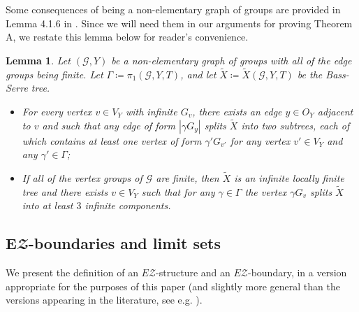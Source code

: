 \documentclass[12pt, a4paper]{article}
\newcommand{\8}{\infty}
\newcommand{\abs}[1]{\left| #1 \right|}
\theoremstyle{break}
\newtheorem{lm}[thm]{Lemma}
\theoremstyle{defbreak}
\newcommand{\wtl}[1]{\widetilde{#1}}
\begin{document}
Some consequences of being a non-elementary graph of groups are provided in Lemma 4.1.6 in \cite{dense-amalgam}. 
Since we will need them in our arguments
 for proving Theorem A, we restate this lemma below
 for reader's convenience.\medskip

\begin{lm}\label{lemma:behaviour_of_nonelementary_gog}
    Let $(\mathcal{G},Y)$ be a non-elementary graph of groups with all of the edge groups being finite. Let $\Gamma\coloneqq\pi_1(\mathcal G, Y, T)$, and let $\wtl{X} \coloneqq\wtl{X}(\mathcal{G}, Y, T)$ be the Bass-Serre tree.
    \begin{itemize}
        \item[(i)] For every vertex $v\in V_Y$ with infinite $G_v$, there exists an edge $y\in O_Y$ adjacent to $v$ and such that any edge of form $\abs{\gamma G_y}$ splits $\wtl{X}$ into two subtrees, each of which contains at least one vertex of form $\gamma' G_{v'}$ for any vertex $v'\in V_Y$ and any $\gamma'\in\Gamma$;
        \item[(ii)] If all of the vertex groups of $\mathcal{G}$ are finite, then 
        $\wtl{X}$ is an infinite locally finite tree and
        there exists $v\in V_Y$ such that for any $\gamma\in\Gamma$ the vertex
        $\gamma G_v$ splits $\wtl{X}$ into at least $3$ infinite components.
    \end{itemize}
\end{lm}




\subsection{\texorpdfstring{$\mathbf{E}\mathbfcal{Z}$}{EZ}-boundaries
and limit sets}\label{Subsection:EZ-boundaries}

We present the definition of an 
$E\mathcal{Z}$-structure and 
an $E\mathcal{Z}$-boundary, in a version appropriate for the purposes of
this paper (and slightly more general than the versions appearing in the literature,
see e.g. \cite{Farell-Lafont, guilbault}).\medskip
\end{document}
